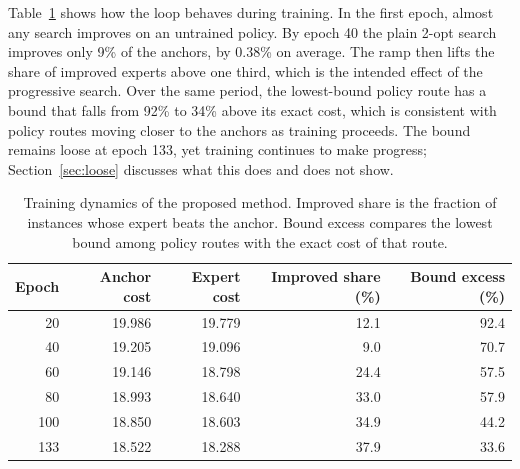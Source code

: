 \documentclass[preprint,12pt,authoryear]{elsarticle}
\begin{document}
Table~\ref{tab:dynamics} shows how the loop behaves during training. In the first epoch, almost any search improves on an untrained policy. By epoch 40 the plain 2-opt search improves only 9\% of the anchors, by 0.38\% on average. The ramp then lifts the share of improved experts above one third, which is the intended effect of the progressive search. Over the same period, the lowest-bound policy route has a bound that falls from 92\% to 34\% above its exact cost, which is consistent with policy routes moving closer to the anchors as training proceeds. The bound remains loose at epoch 133, yet training continues to make progress; Section~\ref{sec:loose} discusses what this does and does not show.

\begin{table}[t]
\centering
\caption{Training dynamics of the proposed method. Improved share is the fraction of instances whose expert beats the anchor. Bound excess compares the lowest bound among policy routes with the exact cost of that route.}
\label{tab:dynamics}
\small
\begin{tabular}{rrrrr}
\toprule
Epoch & Anchor cost & Expert cost & Improved share (\%) & Bound excess (\%) \\
\midrule
20 & 19.986 & 19.779 & 12.1 & 92.4 \\
40 & 19.205 & 19.096 & 9.0 & 70.7 \\
60 & 19.146 & 18.798 & 24.4 & 57.5 \\
80 & 18.993 & 18.640 & 33.0 & 57.9 \\
100 & 18.850 & 18.603 & 34.9 & 44.2 \\
133 & 18.522 & 18.288 & 37.9 & 33.6 \\
\bottomrule
\end{tabular}
\end{table}
\end{document}
